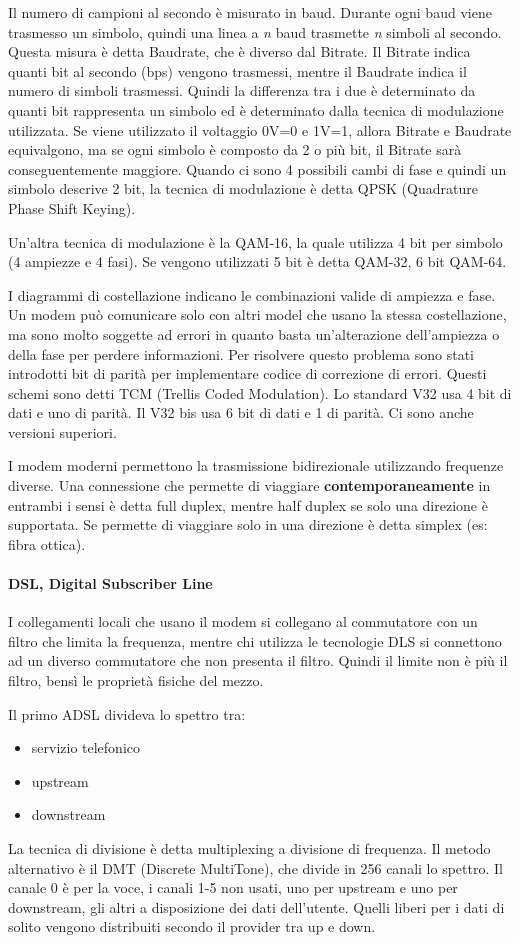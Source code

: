 Il numero di campioni al secondo è misurato in baud. 
Durante ogni baud viene trasmesso un simbolo, quindi una linea a \textit{n} baud trasmette \textit{n} simboli al secondo.
Questa misura è detta Baudrate, che è diverso dal Bitrate.
Il Bitrate indica quanti bit al secondo (bps) vengono trasmessi, mentre il Baudrate indica il numero di simboli trasmessi.
Quindi la differenza tra i due è determinato da quanti bit rappresenta un simbolo ed è determinato dalla tecnica di modulazione utilizzata. 
Se viene utilizzato il voltaggio 0V=0 e 1V=1, allora Bitrate e Baudrate equivalgono, ma se ogni simbolo è composto da 2 o più bit, il Bitrate sarà conseguentemente maggiore.
Quando ci sono 4 possibili cambi di fase e quindi un simbolo descrive 2 bit, la tecnica di modulazione è detta QPSK (Quadrature Phase Shift Keying).

Un'altra tecnica di modulazione è la QAM-16, la quale utilizza 4 bit per simbolo (4 ampiezze e 4 fasi). Se vengono utilizzati 5 bit è detta QAM-32, 6 bit QAM-64.

I diagrammi di costellazione indicano le combinazioni valide di ampiezza e fase. 
Un modem può comunicare solo con altri model che usano la stessa costellazione, ma sono molto soggette ad errori in quanto basta un'alterazione dell'ampiezza o della fase per perdere informazioni.
Per risolvere questo problema sono stati introdotti bit di parità per implementare codice di correzione di errori.
Questi schemi sono detti TCM (Trellis Coded Modulation). Lo standard V32 usa 4 bit di dati e uno di parità.
Il V32 bis usa 6 bit di dati e 1 di parità. Ci sono anche versioni superiori.

I modem moderni permettono la trasmissione bidirezionale utilizzando frequenze diverse.
Una connessione che permette di viaggiare \textbf{contemporaneamente} in entrambi i sensi è detta full duplex, mentre half duplex se solo una direzione è supportata.
Se permette di viaggiare solo in una direzione è detta simplex (es: fibra ottica).

\paragraph{DSL, Digital Subscriber Line}
I collegamenti locali che usano il modem si collegano al commutatore con un filtro che limita la frequenza,
mentre chi utilizza le tecnologie DLS si connettono ad un diverso commutatore che non presenta il filtro.
Quindi il limite non è più il filtro, bensì le proprietà fisiche del mezzo.

Il primo ADSL divideva lo spettro tra:
\begin{itemize}
    \item servizio telefonico
    \item upstream
    \item downstream
\end{itemize}
La tecnica di divisione è detta multiplexing a divisione di frequenza.
Il metodo alternativo è il DMT (Discrete MultiTone), che divide in 256 canali lo spettro.
Il canale 0 è per la voce, i canali 1-5 non usati, uno per upstream e uno per downstream, gli altri a disposizione dei dati dell'utente.
Quelli liberi per i dati di solito vengono distribuiti secondo il provider tra up e down.

